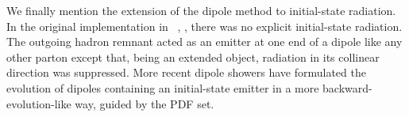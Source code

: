 We finally mention the extension of the dipole method to initial-state
radiation.  In the original implementation
in \Ariadne~\cite{Lonnblad:1992tz}, , there was no
explicit initial-state radiation.  The outgoing hadron remnant acted as
an emitter at one end of a dipole like any other parton except that,
being an extended object, radiation in its collinear direction was
suppressed.
More recent dipole showers have formulated the evolution of dipoles
containing an initial-state emitter in a more backward-evolution-like
way, guided by the PDF set.


